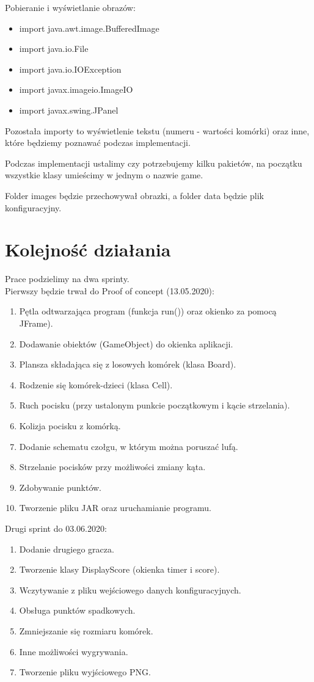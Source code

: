 \documentclass{article}
\begin{document}
Pobieranie i wyświetlanie obrazów:
\begin{itemize}
    \item import java.awt.image.BufferedImage
    \item import java.io.File
    \item import java.io.IOException
    \item import javax.imageio.ImageIO
    \item import javax.swing.JPanel
\end{itemize}

Pozostała importy to wyświetlenie tekstu (numeru - wartości komórki) oraz inne, które będziemy poznawać podczas implementacji.

Podczas implementacji ustalimy czy potrzebujemy kilku pakietów, na początku wszystkie klasy umieścimy w jednym o nazwie game.

Folder images będzie przechowywał obrazki, a folder data będzie plik konfiguracyjny.

\clearpage

\section{Kolejność działania}
Prace podzielimy na dwa sprinty.\\
Pierwszy będzie trwał do Proof of concept (13.05.2020):
\begin{enumerate}
    \item Pętla odtwarzająca program (funkcja run()) oraz okienko za pomocą JFrame).
    \item Dodawanie obiektów (GameObject) do okienka aplikacji.
    \item Plansza składająca się z losowych komórek (klasa Board).
    \item Rodzenie się komórek-dzieci (klasa Cell).
    \item Ruch pocisku (przy ustalonym punkcie początkowym i kącie strzelania).
    \item Kolizja pocisku z komórką.
    \item Dodanie schematu czołgu, w którym można poruszać lufą.
    \item Strzelanie pocisków przy możliwości zmiany kąta. 
    \item Zdobywanie punktów.
    \item Tworzenie pliku JAR oraz uruchamianie programu.
\end{enumerate}

Drugi sprint do 03.06.2020:
\begin{enumerate}
    \item Dodanie drugiego gracza.
    \item Tworzenie klasy DisplayScore (okienka timer i score).
    \item Wczytywanie z pliku wejściowego danych konfiguracyjnych. 
    \item Obsługa punktów spadkowych.
    \item Zmniejszanie się rozmiaru komórek.
    \item Inne możliwości wygrywania.
    \item Tworzenie pliku wyjściowego PNG.
\end{enumerate}
\end{document}
